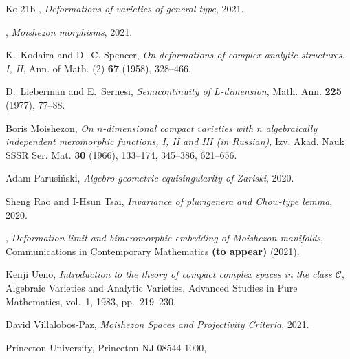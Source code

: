\documentclass{amsart}
\theoremstyle{definition}
\theoremstyle{remark}
\begin{document}
\begin{thebibliography}{Kol21b}
\bysame, \emph{Deformations of varieties of general type}, 2021.

\bysame, \emph{Moishezon morphisms}, 2021.

K.~Kodaira and D.~C. Spencer, \emph{On deformations of complex analytic
  structures. {I}, {II}}, Ann. of Math. (2) \textbf{67} (1958), 328--466.

D.~Lieberman and E.~Sernesi, \emph{Semicontinuity of {$L$}-dimension}, Math.
  Ann. \textbf{225} (1977), 77--88.

Boris Moishezon, \emph{On $n$-dimensional compact varieties with $n$
  algebraically independent meromorphic functions, {I}, {II} and {III} (in
  {R}ussian)}, Izv. Akad. Nauk SSSR Ser. Mat. \textbf{30} (1966), 133--174,
  345--386, 621--656.

Adam Parusi\'nski, \emph{Algebro-geometric equisingularity of {Z}ariski}, 2020.

Sheng Rao and I-Hsun Tsai, \emph{Invariance of plurigenera and {C}how-type
  lemma}, 2020.

\bysame, \emph{Deformation limit and bimeromorphic embedding of {M}oishezon
  manifolds}, Communications in Contemporary Mathematics \textbf{(to appear)}
  (2021).

Kenji Ueno, \emph{Introduction to the theory of compact complex spaces in the
  class {$\mathcal C$}}, Algebraic Varieties and Analytic Varieties, Advanced
  Studies in Pure Mathematics, vol.~1, 1983, pp.~219--230.

David Villalobos-Paz, \emph{{Moishezon Spaces and Projectivity Criteria}},
  2021.

\end{thebibliography}


\bigskip


  Princeton University, Princeton NJ 08544-1000, \

\end{document}
